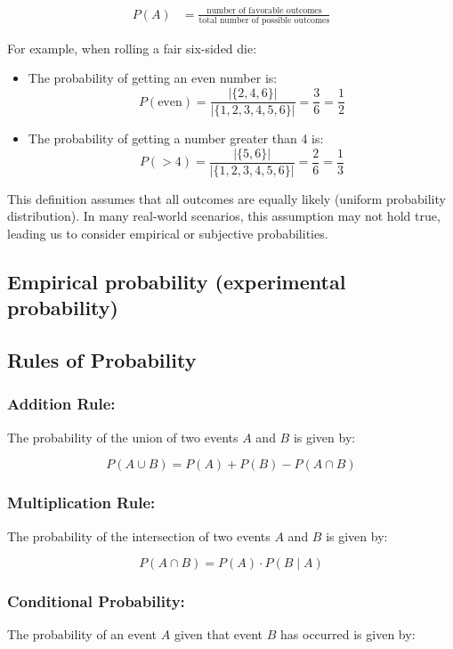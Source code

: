 \documentclass{article}
\begin{document}
\begin{align*}
    P(A) &= \frac{\text{number of favorable outcomes}}{\text{total number of possible outcomes}}
\end{align*}


For example, when rolling a fair six-sided die:

\begin{itemize}
    \item The probability of getting an even number is:
    $$P(\text{even}) = \frac{|\{2,4,6\}|}{|\{1,2,3,4,5,6\}|} = \frac{3}{6} = \frac{1}{2}$$

    \item The probability of getting a number greater than 4 is:
    $$P(>4) = \frac{|\{5,6\}|}{|\{1,2,3,4,5,6\}|} = \frac{2}{6} = \frac{1}{3}$$
\end{itemize}

This definition assumes that all outcomes are equally likely (uniform probability distribution). In many real-world scenarios, this assumption may not hold true, leading us to consider empirical or subjective probabilities.

\subsection*{Empirical probability (experimental probability)}

\subsection*{Rules of Probability}

\subsubsection*{Addition Rule:}
The probability of the union of two events $A$ and $B$ is given by:

$$
P(A \cup B) = P(A) + P(B) - P(A \cap B)
$$

\subsubsection*{Multiplication Rule:}
The probability of the intersection of two events $A$ and $B$ is given by:

$$
P(A \cap B) = P(A) \cdot P(B \mid A)
$$

\subsubsection*{Conditional Probability:}
The probability of an event $A$ given that event $B$ has occurred is given by:
\end{document}

